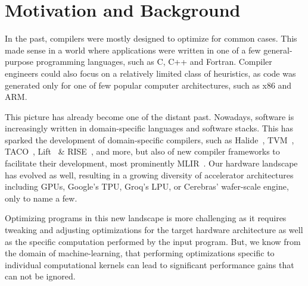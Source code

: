 \documentclass[screen,nonacm,authorversion]{acmart}
\begin{document}
\section{Motivation and Background}

In the past, compilers were mostly designed to optimize for common cases.%
This made sense in a world where applications were written in one of a few general-purpose programming languages, such as C, C++ and Fortran.
Compiler engineers could also focus on a relatively limited class of heuristics, as code was generated only for one of few popular computer architectures, such as x86 and ARM.

This picture has already become one of the distant past.
Nowadays, software is increasingly written in domain-specific languages and software stacks. This has sparked the development of domain-specific compilers, such as Halide~\cite{halide}, TVM~\cite{tvm}, TACO~\cite{taco}, Lift~\cite{lift} \& RISE~\cite{rise}, and more, but also of new compiler frameworks to facilitate their development, most prominently MLIR~\cite{lattner2020mlir}.
Our hardware landscape has evolved as well, resulting in a growing diversity of accelerator architectures including GPUs, Google's TPU, Groq's LPU, or Cerebras' wafer-scale engine, only to name a few.

Optimizing programs in this new landscape is more challenging as it requires tweaking and adjusting optimizations for the target hardware architecture as well as the specific computation performed by the input program.
But, we know from the domain of machine-learning, that performing optimizations specific to individual computational kernels can lead to significant performance gains that can not be ignored.
\end{document}
